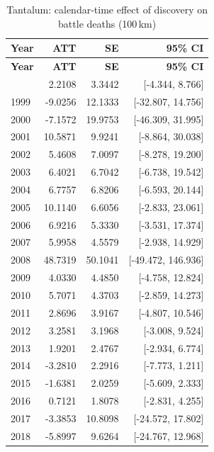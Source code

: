 \begin{longtable}{lrrr}
\caption{Tantalum: calendar-time effect of discovery on battle deaths (100\,km)} \label{tab:cal_tantalum} \\
\toprule
\textbf{Year} & \textbf{ATT} & \textbf{SE} & \textbf{95\% CI} \\
\midrule \endfirsthead
\toprule
\textbf{Year} & \textbf{ATT} & \textbf{SE} & \textbf{95\% CI} \\
\midrule \endhead
\bottomrule \endlastfoot
1998 & 2.2108 & 3.3442 & [-4.344, 8.766] \\
1999 & -9.0256 & 12.1333 & [-32.807, 14.756] \\
2000 & -7.1572 & 19.9753 & [-46.309, 31.995] \\
2001 & 10.5871 & 9.9241 & [-8.864, 30.038] \\
2002 & 5.4608 & 7.0097 & [-8.278, 19.200] \\
2003 & 6.4021 & 6.7042 & [-6.738, 19.542] \\
2004 & 6.7757 & 6.8206 & [-6.593, 20.144] \\
2005 & 10.1140 & 6.6056 & [-2.833, 23.061] \\
2006 & 6.9216 & 5.3330 & [-3.531, 17.374] \\
2007 & 5.9958 & 4.5579 & [-2.938, 14.929] \\
2008 & 48.7319 & 50.1041 & [-49.472, 146.936] \\
2009 & 4.0330 & 4.4850 & [-4.758, 12.824] \\
2010 & 5.7071 & 4.3703 & [-2.859, 14.273] \\
2011 & 2.8696 & 3.9167 & [-4.807, 10.546] \\
2012 & 3.2581 & 3.1968 & [-3.008, 9.524] \\
2013 & 1.9201 & 2.4767 & [-2.934, 6.774] \\
2014 & -3.2810 & 2.2916 & [-7.773, 1.211] \\
2015 & -1.6381 & 2.0259 & [-5.609, 2.333] \\
2016 & 0.7121 & 1.8078 & [-2.831, 4.255] \\
2017 & -3.3853 & 10.8098 & [-24.572, 17.802] \\
2018 & -5.8997 & 9.6264 & [-24.767, 12.968] \\
\end{longtable}

